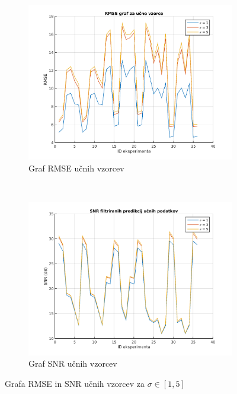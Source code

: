 \begin{figure}[htb]
\centering
\begin{subfigure}[t]{0.45\columnwidth}
\includegraphics[width=\columnwidth]{./Slike/sigma-rmse1-5.png}
\caption{Graf RMSE  učnih vzorcev }
\label{fig:sigma-rmse1-5}
\end{subfigure}
~
\begin{subfigure}[t]{0.45\columnwidth}
\includegraphics[width=\columnwidth]{./Slike/sigma-snr1-5.png}
\caption{Graf SNR  učnih vzorcev}
\label{fig:sigma-snr1-5}
\end{subfigure}
\caption{Grafa RMSE in SNR učnih vzorcev za \mbox{$\sigma \in [1,5]$}}
\label{fig:sigma1-5}
\end{figure}

